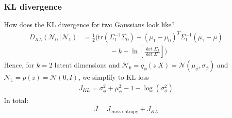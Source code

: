 \documentclass{beamer}
\newcommand{\cN}{\mathcal{N}}
\begin{document}
\begin{frame}
\frametitle{KL divergence}

How does the KL divergence for two Gaussians look like?
\begin{align}
	D_{KL} (\cN_0 || \cN_1) &= \frac{1}{2} \bigg( \text{tr} ( \Sigma_1^{-1} \Sigma_0) + (\mu_1 - \mu_0)^T \Sigma_1^{-1} (\mu_1 - \mu) \nonumber  \\
	& \qquad \qquad   - k + \ln \left[ \frac{\det \Sigma_1}{\det \Sigma_0}\right] \bigg)
\end{align}
Hence, for $k=2$ latent dimensions and $\cN_0 = q_\phi (z|X) = \cN (\mu_\phi, \sigma_\phi) $ and $\cN_1 = p (z) = \cN(0,I)$, we simplify to KL loss
\begin{align}
	J_{KL} =  \sigma^2_\phi + \mu_\phi^2 - 1 - \log(\sigma^2_\phi)
\end{align}
In total:
\begin{align}
 J = J_{\text{cross entropy}} + J_{KL} 
\end{align}


\end{frame}
\end{document}
